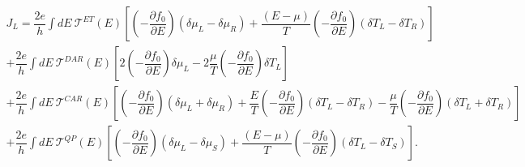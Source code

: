 \begin{multline}\label{current3}
J_{L}
=
\dfrac{2e}{h}\int dE~\mathcal{T}^{ET}(E)
\left[
\left(-\dfrac{\partial f_{0}}{\partial E}\right)(\delta\mu_{L}-\delta\mu_{R})
+
\dfrac{(E-\mu)}{T}\left(-\dfrac{\partial f_{0}}{\partial E}\right)(\delta T_{L}-\delta T_{R})
\right]
\\+
\dfrac{2e}{h}\int dE~\mathcal{T}^{DAR}(E)
\left[
2\left(-\dfrac{\partial f_{0}}{\partial E}\right)\delta\mu_{L}
-2
\dfrac{\mu}{T}\left(-\dfrac{\partial f_{0}}{\partial E}\right)\delta T_{L}
\right]
\\+
\dfrac{2e}{h}\int dE~\mathcal{T}^{CAR}(E)\left[
\left(-\dfrac{\partial f_{0}}{\partial E}\right)(\delta\mu_{L}+\delta\mu_{R})
+
\dfrac{E}{T}\left(-\dfrac{\partial f_{0}}{\partial E}\right)(\delta T_{L}-\delta T_{R})
-
\dfrac{\mu}{T}\left(-\dfrac{\partial f_{0}}{\partial E}\right)(\delta T_{L}+\delta T_{R})
\right]
\\+\dfrac{2e}{h}\int dE~\mathcal{T}^{QP}(E)
\left[
\left(-\dfrac{\partial f_{0}}{\partial E}\right)(\delta\mu_{L}-\delta\mu_{S})
+
\dfrac{(E-\mu)}{T}\left(-\dfrac{\partial f_{0}}{\partial E}\right)(\delta T_{L}-\delta T_{S})
\right].
\end{multline}

